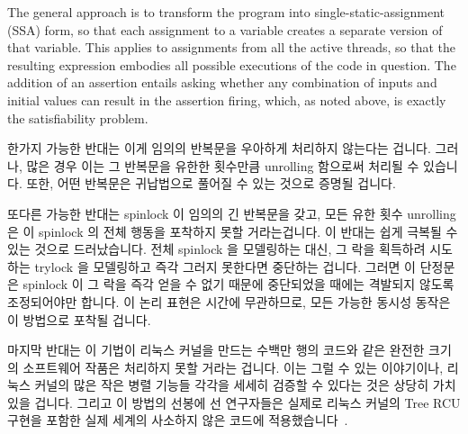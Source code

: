 The general approach is to transform the program into single-static-assignment
(SSA) form, so that each assignment to a variable creates a separate
version of that variable.
This applies to assignments from all the active threads, so that the
resulting expression embodies all possible executions of the code
in question.
The addition of an assertion entails asking whether any combination of
inputs and initial values can result in the assertion firing, which,
as noted above, is exactly the satisfiability problem.

\fi

한가지 가능한 반대는 이게 임의의 반복문을 우아하게 처리하지 않는다는 겁니다.
그러나, 많은 경우 이는 그 반복문을 유한한 횟수만큼 unrolling 함으로써 처리될 수
있습니다.
또한, 어떤 반복문은 귀납법으로 풀어질 수 있는 것으로 증명될 겁니다.

또다른 가능한 반대는 spinlock 이 임의의 긴 반복문을 갖고, 모든 유한 횟수
unrolling 은 이 spinlock 의 전체 행동을 포착하지 못할 거라는겁니다.
이 반대는 쉽게 극복될 수 있는 것으로 드러났습니다.
전체 spinlock 을 모델링하는 대신, 그 락을 획득하려 시도하는 trylock 을
모델링하고 즉각 그러지 못한다면 중단하는 겁니다.
그러면 이 단정문은 spinlock 이 그 락을 즉각 얻을 수 없기 때문에 중단되었을
때에는 격발되지 않도록 조정되어야만 합니다.
이 논리 표현은 시간에 무관하므로, 모든 가능한 동시성 동작은 이 방법으로 포착될
겁니다.

\iffalse

One possible objection is that it does not gracefully handle arbitrary
looping constructs.
However, in many cases, this can be handled by unrolling the loop a
finite number of times.
In addition, perhaps some loops will also prove amenable to collapse
via inductive methods.

Another possible objection is that spinlocks involve arbitrarily long
loops, and any finite unrolling would fail to capture the full behavior
of the spinlock.
It turns out that this objection is easily overcome.
Instead of modeling a full spinlock, model a trylock that attempts to
obtain the lock, and aborts if it fails to immediately do so.
The assertion must then be crafted so as to avoid firing in cases
where a spinlock aborted due to the lock not being immediately available.
Because the logic expression is independent of time, all possible
concurrency behaviors will be captured via this approach.

\fi

마지막 반대는 이 기법이 리눅스 커널을 만드는 수백만 행의 코드와 같은 완전한
크기의 소프트웨어 작품은 처리하지 못할 거라는 겁니다.
이는 그럴 수 있는 이야기이나, 리눅스 커널의 많은 작은 병렬 기능들 각각을 세세히
검증할 수 있다는 것은 상당히 가치있을 겁니다.
그리고 이 방법의 선봉에 선 연구자들은 실제로 리눅스 커널의 Tree RCU 구현을
포함한 실제 세계의 사소하지 않은 코드에
적용했습니다~\cite{LihaoLiang2016VerifyTreeRCU,MichalisKokologiannakis2017NidhuggRCU}.

